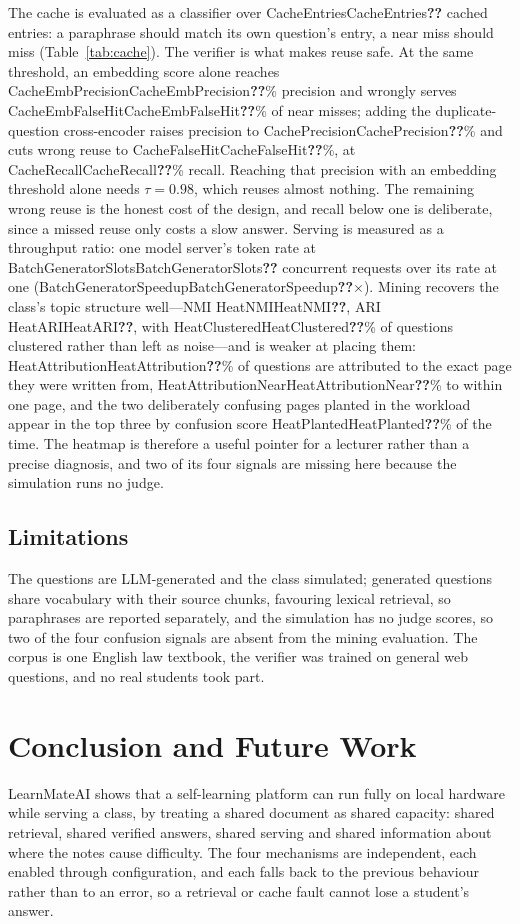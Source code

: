 \documentclass[conference]{IEEEtran}
\newcommand{\val}[1]{\ifcsname #1\endcsname\csname #1\endcsname\else\textbf{??}\fi}
\newcommand{\sys}{LearnMateAI}
\begin{document}
The cache is evaluated as a classifier over \val{CacheEntries} cached entries: a paraphrase should match its own
question's entry, a near miss should miss (Table~\ref{tab:cache}). The verifier is what makes reuse safe. At the
same threshold, an embedding score alone reaches \val{CacheEmbPrecision}\% precision and wrongly serves
\val{CacheEmbFalseHit}\% of near misses; adding the duplicate-question cross-encoder raises precision to
\val{CachePrecision}\% and cuts wrong reuse to \val{CacheFalseHit}\%, at \val{CacheRecall}\% recall. Reaching
that precision with an embedding threshold alone needs $\tau{=}0.98$, which reuses almost nothing. The
remaining wrong reuse is the honest cost of the design, and recall below one is deliberate, since a missed
reuse only costs a slow answer. Serving is measured as a throughput ratio: one model server's token rate at
\val{BatchGeneratorSlots} concurrent requests over its rate at one
(\val{BatchGeneratorSpeedup}$\times$). Mining recovers the class's topic structure well---NMI \val{HeatNMI},
ARI \val{HeatARI}, with \val{HeatClustered}\% of questions clustered rather than left as noise---and is weaker
at placing them: \val{HeatAttribution}\% of questions are attributed to the exact page they were written from,
\val{HeatAttributionNear}\% to within one page, and the two deliberately confusing pages planted in the
workload appear in the top three by confusion score \val{HeatPlanted}\% of the time. The heatmap is therefore
a useful pointer for a lecturer rather than a precise diagnosis, and two of its four signals are missing here
because the simulation runs no judge.

\subsection{Limitations}

The questions are LLM-generated and the class simulated; generated questions share vocabulary with their
source chunks, favouring lexical retrieval, so paraphrases are reported separately, and the simulation has
no judge scores, so two of the four confusion signals are absent from the mining evaluation. The corpus is
one English law textbook, the verifier was trained on general web questions, and no real students took part.

\section{Conclusion and Future Work}

\sys{} shows that a self-learning platform can run fully on local hardware while serving a class, by
treating a shared document as shared capacity: shared retrieval, shared verified answers, shared serving and
shared information about where the notes cause difficulty. The four mechanisms are independent, each enabled
through configuration, and each falls back to the previous behaviour rather than to an error, so a retrieval or
cache fault cannot lose a student's answer.
\end{document}
